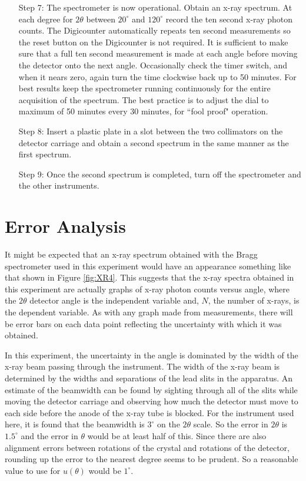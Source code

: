 \begin{itemize}[leftmargin = 50pt]
    \item[Step 7:] The spectrometer is now operational. Obtain an x-ray spectrum. At each degree for $2\theta$ between $20^{\circ}$ and $120^{\circ}$ record the ten second x-ray photon counts. The Digicounter automatically repeats ten second measurements so the reset button on the Digicounter is not required. It is sufficient to make sure that a full ten second measurement is made at each angle before moving the detector onto the next angle. Occasionally check the timer switch, and when it nears zero, again turn the time clockwise back up to 50 minutes. For best results keep the spectrometer running continuously for the entire acquisition of the spectrum. The best practice is to adjust the dial to maximum of 50 minutes every 30 minutes, for ``fool proof" operation.
    \item[Step 8:] Insert a plastic plate in a slot between the two collimators on the detector carriage and obtain a second spectrum in the same manner as the first spectrum.
    \item[Step 9:] Once the second spectrum is completed, turn off the spectrometer and the other instruments.
\end{itemize}


\section{Error Analysis}

It might be expected that an x-ray spectrum obtained with the Bragg spectrometer used in this experiment would have an appearance something like that shown in Figure \ref{fig:XR4}. This suggests that the x-ray spectra obtained in this experiment are actually graphs of x-ray photon counts versus angle, where the $2\theta$ detector angle is the independent variable and, $N$, the number of x-rays, is the dependent variable. As with any graph made from measurements, there will be error bars on each data point reflecting the uncertainty with which it was obtained.

\noindent In this experiment, the uncertainty in the angle is dominated by the width of the x-ray beam passing through the instrument. The width of the x-ray beam is determined by the widths and separations of the lead slits in the apparatus. An estimate of the beamwidth can be found by sighting through all of the slits while moving the detector carriage and observing how much the detector must move to each side before the anode of the x-ray tube is blocked. For the instrument used here, it is found that the beamwidth is $3^{\circ}$ on the $2\theta$ scale. So the error in $2\theta$ is $1.5^{\circ}$ and the error in $\theta$ would be at least half of this. Since there are also alignment errors between rotations of the crystal and rotations of the detector, rounding up the error to the nearest degree seems to be prudent. So a reasonable value to use for $u(\theta)$ would be $1^{\circ}.$

